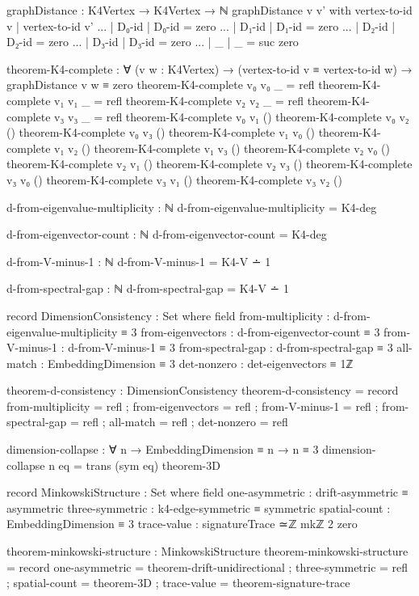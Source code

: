 \documentclass[11pt,a4paper]{book}
\begin{document}
\begin{code}
graphDistance : K4Vertex → K4Vertex → ℕ
graphDistance v v' with vertex-to-id v | vertex-to-id v'
... | D₀-id | D₀-id = zero
... | D₁-id | D₁-id = zero
... | D₂-id | D₂-id = zero
... | D₃-id | D₃-id = zero
... | _   | _   = suc zero

theorem-K4-complete : ∀ (v w : K4Vertex) → 
  (vertex-to-id v ≡ vertex-to-id w) → graphDistance v w ≡ zero
theorem-K4-complete v₀ v₀ _ = refl
theorem-K4-complete v₁ v₁ _ = refl
theorem-K4-complete v₂ v₂ _ = refl
theorem-K4-complete v₃ v₃ _ = refl
theorem-K4-complete v₀ v₁ ()
theorem-K4-complete v₀ v₂ ()
theorem-K4-complete v₀ v₃ ()
theorem-K4-complete v₁ v₀ ()
theorem-K4-complete v₁ v₂ ()
theorem-K4-complete v₁ v₃ ()
theorem-K4-complete v₂ v₀ ()
theorem-K4-complete v₂ v₁ ()
theorem-K4-complete v₂ v₃ ()
theorem-K4-complete v₃ v₀ ()
theorem-K4-complete v₃ v₁ ()
theorem-K4-complete v₃ v₂ ()

d-from-eigenvalue-multiplicity : ℕ
d-from-eigenvalue-multiplicity = K4-deg

d-from-eigenvector-count : ℕ
d-from-eigenvector-count = K4-deg

d-from-V-minus-1 : ℕ
d-from-V-minus-1 = K4-V ∸ 1

d-from-spectral-gap : ℕ
d-from-spectral-gap = K4-V ∸ 1

record DimensionConsistency : Set where
  field
    from-multiplicity   : d-from-eigenvalue-multiplicity ≡ 3
    from-eigenvectors   : d-from-eigenvector-count ≡ 3
    from-V-minus-1      : d-from-V-minus-1 ≡ 3
    from-spectral-gap   : d-from-spectral-gap ≡ 3
    all-match           : EmbeddingDimension ≡ 3
    det-nonzero         : det-eigenvectors ≡ 1ℤ

theorem-d-consistency : DimensionConsistency
theorem-d-consistency = record
  { from-multiplicity   = refl
  ; from-eigenvectors   = refl
  ; from-V-minus-1      = refl
  ; from-spectral-gap   = refl
  ; all-match           = refl
  ; det-nonzero         = refl
  }

dimension-collapse : ∀ n → EmbeddingDimension ≡ n → n ≡ 3
dimension-collapse n eq = trans (sym eq) theorem-3D

record MinkowskiStructure : Set where
  field
    one-asymmetric   : drift-asymmetric ≡ asymmetric
    three-symmetric  : k4-edge-symmetric ≡ symmetric
    spatial-count    : EmbeddingDimension ≡ 3
    trace-value      : signatureTrace ≃ℤ mkℤ 2 zero

theorem-minkowski-structure : MinkowskiStructure
theorem-minkowski-structure = record
  { one-asymmetric = theorem-drift-unidirectional
  ; three-symmetric = refl
  ; spatial-count = theorem-3D
  ; trace-value = theorem-signature-trace
  }


\end{code}
\end{document}
